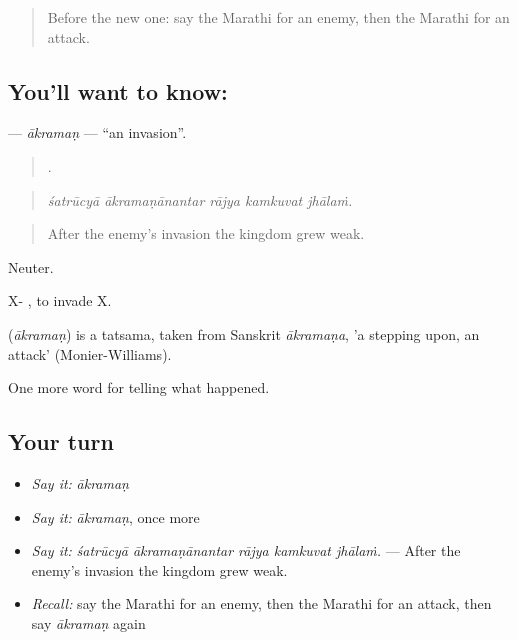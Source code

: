 \label{lesson:MR-C328-akraman}



\begin{quote}
Before the new one: say the Marathi for an enemy, then the Marathi for an attack.
\end{quote}

\subsection*{You'll want to know: }
\textbf{} — \emph{ākramaṇ} — \textquotedblleft{}an invasion\textquotedblright{}.

\begin{quote}
    .
\end{quote}

\begin{quote}
\emph{śatrūcyā ākramaṇānantar rājya kamkuvat jhālaṁ.}
\end{quote}

\begin{quote}
After the enemy's invasion the kingdom grew weak.
\end{quote}

Neuter.

X-  , to invade X.

\begin{cousinweb}
\textbf{} (\emph{ākramaṇ}) is a tatsama, taken from Sanskrit \emph{ākramaṇa}, 'a stepping upon, an attack' (Monier-Williams).
\end{cousinweb}

\begin{grammarlens}[title={What you've built}]
One more word for telling what happened.
\end{grammarlens}

\subsection*{Your turn}
\begin{itemize}
\raggedright
  \item \emph{Say it:} \emph{ākramaṇ}
  \item \emph{Say it:} \emph{ākramaṇ}, once more
  \item \emph{Say it:} \emph{śatrūcyā ākramaṇānantar rājya kamkuvat jhālaṁ.} — After the enemy's invasion the kingdom grew weak.
  \item \emph{Recall:} say the Marathi for an enemy, then the Marathi for an attack, then say \emph{ākramaṇ} again
\end{itemize}

